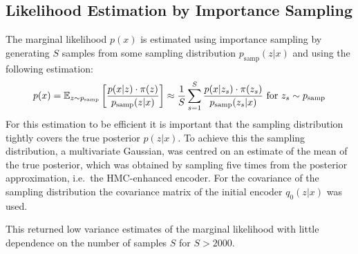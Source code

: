 \begin{appendices}

\section{Likelihood Estimation by Importance Sampling}
\label{app:NLLestimateImportSampling}

The marginal likelihood $p(x)$ is estimated using importance sampling by generating $S$ samples from some sampling distribution $p_\textrm{samp}(z|x)$ and using the following estimation:
\begin{equation}
p(x) = \mathbb{E}_{z \sim p_\textrm{samp}} \left[\frac{p(x|z) \cdot \pi(z)}{p_\textrm{samp}(z|x)} \right] \approx \frac{1}{S} \sum_{s=1}^S \frac{p(x|z_s) \cdot \pi(z_s)}{p_\textrm{samp}(z_s|x)} \textrm{ for } z_s \sim p_\textrm{samp}
\end{equation}
For this estimation to be efficient it is important that the sampling distribution tightly covers the true posterior $p(z|x)$. To achieve this the sampling distribution, a multivariate Gaussian, was centred on an estimate of the mean of the true posterior, which was obtained by sampling five times from the posterior approximation, i.e.\ the HMC-enhanced encoder. For the covariance of the sampling distribution the covariance matrix of the initial encoder $q_0(z|x)$ was used.

This returned low variance estimates of the marginal likelihood with little dependence on the number of samples $S$ for $S > 2000$.

\end{appendices}